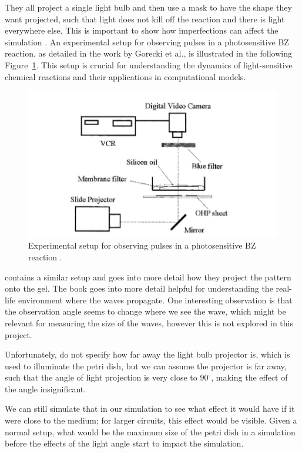 They all project a single light bulb and then use a mask to have the shape they want projected, such that light does not kill off the reaction and there is light everywhere else. This is important to show how imperfections can affect the simulation . \cite{gorecki2003chemical}
An experimental setup for observing pulses in a photosensitive BZ reaction, as detailed in the work by Gorecki et al., is illustrated in the following Figure~\ref{fig:gorecki-setup}. This setup is crucial for understanding the dynamics of light-sensitive chemical reactions and their applications in computational models.

\begin{figure}[H]
    \centering
    \includegraphics[width=0.7\linewidth]{images/Screenshot 2024-03-10 at 20.23.20.png}
    \caption{Experimental setup for observing pulses in a photosensitive BZ reaction \citep{gorecki2003chemical}.}
    \label{fig:gorecki-setup}
\end{figure}

\cite[71]{cui2004synchronization} contains a similar setup and goes into more detail how they project the pattern onto the gel. 
The book goes into more detail helpful for understanding the real-life environment where the waves propagate. 
One interesting observation is that the observation angle seems to change where we see the wave, which might be relevant for measuring the size of the waves, however this is not explored in this project.

\begin{tcolorbox}[colback=red!5!white,colframe=red!75!black,title=Assumption]
Unfortunately, \cite{gorecki2003chemical} do not specify how far away the light bulb projector is, which is used to illuminate the petri dish, but we can assume the projector is far away, such that the angle of light projection is very close to $90^\circ$, making the effect of the angle insignificant. 
\end{tcolorbox}
We can still simulate that in our simulation to see what effect it would have if it were close to the medium; for larger circuits, this effect would be visible. Given a normal setup, what would be the maximum size of the petri dish in a simulation before the effects of the light angle start to impact the simulation.




